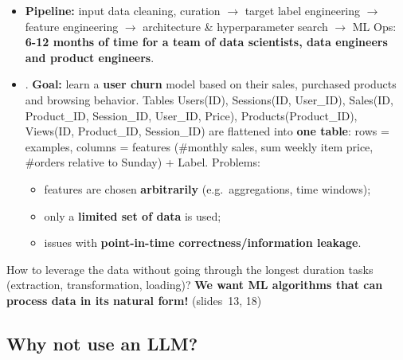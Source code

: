 \begin{itemize}
  \item \textbf{Pipeline:} input data cleaning, curation $\to$ target label engineering
    $\to$ feature engineering $\to$ architecture \& hyperparameter search $\to$ ML Ops:
    \textbf{6-12 months of time for a team of data scientists, data engineers and product
    engineers}.
  \item {}. \textbf{Goal:} learn a \textbf{user churn} model based
    on their sales, purchased products and browsing behavior. Tables Users(ID),
    Sessions(ID, User\_ID), Sales(ID, Product\_ID, Session\_ID, User\_ID, Price),
    Products(Product\_ID), Views(ID, Product\_ID, Session\_ID) are flattened into
    \textbf{one table}: rows = examples, columns = features (\#monthly sales, sum weekly
    item price, \#orders relative to Sunday) + Label. Problems:
    \begin{itemize}
      \item features are chosen \textbf{arbitrarily} (e.g.\ aggregations, time windows);
      \item only a \textbf{limited set of data} is used;
      \item issues with \textbf{point-in-time correctness/information leakage}.
    \end{itemize}
\end{itemize}

\begin{keyidea}
  How to leverage the data without going through the longest duration tasks
  (extraction, transformation, loading)? \textbf{We want ML algorithms that can process
  data in its natural form!} (slides~13, 18)
\end{keyidea}

\subsection{Why not use an LLM?}\label{sec:lec12-llm}

